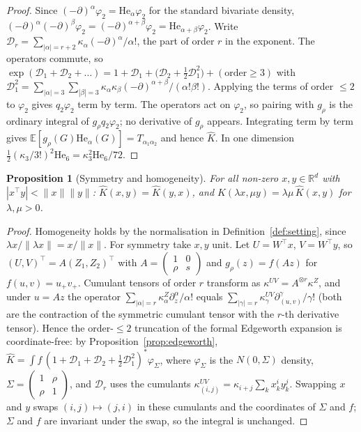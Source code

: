 \documentclass[11pt]{article}
\newtheorem{proposition}{Proposition}
\theoremstyle{definition}
\newcommand{\E}{\mathbb{E}}
\newcommand{\R}{\mathbb{R}}
\newcommand{\He}{\mathrm{He}}
\begin{document}
\begin{proof}
Since $(-\partial)^\alpha\varphi_2=\He_\alpha\varphi_2$ for the standard bivariate density,
$(-\partial)^\alpha(-\partial)^\beta\varphi_2=(-\partial)^{\alpha+\beta}\varphi_2=\He_{\alpha+\beta}\varphi_2$.
Write $\mathcal D_r=\sum_{|\alpha|=r+2}\kappa_\alpha(-\partial)^\alpha/\alpha!$, the part of
order $r$ in the exponent. The operators commute, so
$\exp(\mathcal D_1+\mathcal D_2+\dots)=1+\mathcal D_1+\big(\mathcal D_2+\tfrac12\mathcal D_1^2\big)+(\text{order}\ge3)$
with
$\mathcal D_1^2=\sum_{|\alpha|=3}\sum_{|\beta|=3}\kappa_\alpha\kappa_\beta(-\partial)^{\alpha+\beta}/(\alpha!\beta!)$.
Applying the terms of order $\le2$ to $\varphi_2$ gives $q_2\varphi_2$ term by term. The
operators act on $\varphi_2$, so pairing with $g_\rho$ is the ordinary integral of
$g_\rho q_2\varphi_2$; no derivative of $g_\rho$ appears. Integrating term by term gives
$\E[g_\rho(G)\He_\alpha(G)]=T_{\alpha_1\alpha_2}$ and hence $\widehat K$. In one
dimension $\tfrac12(\kappa_3/3!)^2\He_6=\kappa_3^2\He_6/72$.
\end{proof}

\begin{proposition}[Symmetry and homogeneity]\label{prop:symhom}
For all non-zero $x,y\in\R^d$ with $|x^\top y|<\|x\|\|y\|$:
$\widehat K(x,y)=\widehat K(y,x)$, and
$\widehat K(\lambda x,\mu y)=\lambda\mu\,\widehat K(x,y)$ for $\lambda,\mu>0$.
\end{proposition}

\begin{proof}
Homogeneity holds by the normalisation in Definition~\ref{def:setting}, since
$\lambda x/\|\lambda x\|=x/\|x\|$. For symmetry take $x,y$ unit. Let $U=W^\top x$,
$V=W^\top y$, so $(U,V)^\top=A(Z_1,Z_2)^\top$ with $A=\begin{pmatrix}1&0\\ \rho&s\end{pmatrix}$
and $g_\rho(z)=f(Az)$ for $f(u,v)=u_+v_+$. Cumulant tensors of order $r$ transform as
$\kappa^{UV}=A^{\otimes r}\kappa^{Z}$, and under $u=Az$ the operator
$\sum_{|\alpha|=r}\kappa^Z_\alpha\partial_z^\alpha/\alpha!$ equals
$\sum_{|\gamma|=r}\kappa^{UV}_\gamma\partial_{(u,v)}^\gamma/\gamma!$ (both are the
contraction of the symmetric cumulant tensor with the $r$-th derivative tensor). Hence the
order-$\le2$ truncation of the formal Edgeworth expansion is coordinate-free: by
Proposition~\ref{prop:edgeworth}, $\widehat K=\int f\,(1+\mathcal D_1+\mathcal D_2+\tfrac12\mathcal D_1^2)^{*}\varphi_\Sigma$,
where $\varphi_\Sigma$ is the $N(0,\Sigma)$ density, $\Sigma=\begin{pmatrix}1&\rho\\ \rho&1\end{pmatrix}$,
and $\mathcal D_r$ uses the cumulants $\kappa^{UV}_{(i,j)}=\kappa_{i+j}\sum_kx_k^iy_k^j$.
Swapping $x$ and $y$ swaps $(i,j)\mapsto(j,i)$ in these cumulants and the coordinates of
$\Sigma$ and $f$; $\Sigma$ and $f$ are invariant under the swap, so the integral is
unchanged.
\end{proof}
\end{document}
